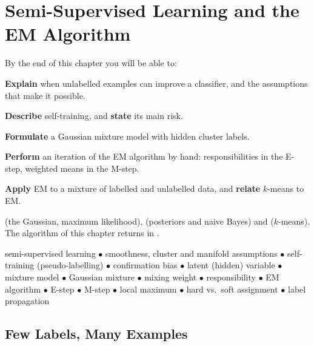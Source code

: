 \chapter{Semi-Supervised Learning and the EM Algorithm}\label{ch:semisup}

\begin{outcomes}
By the end of this chapter you will be able to:
\begin{tight}
  \item \textbf{Explain} when unlabelled examples can improve a classifier, and the
        assumptions that make it possible.
  \item \textbf{Describe} self-training, and \textbf{state} its main risk.
  \item \textbf{Formulate} a Gaussian mixture model with hidden cluster labels.
  \item \textbf{Perform} an iteration of the EM algorithm by hand: responsibilities
        in the E-step, weighted means in the M-step.
  \item \textbf{Apply} EM to a mixture of labelled and unlabelled data, and
        \textbf{relate} $k$-means to EM.
\end{tight}
\end{outcomes}

\begin{prereq}
 (the Gaussian, maximum likelihood),  (posteriors and
naive Bayes) and  ($k$-means). The algorithm of this chapter
returns in .
\end{prereq}

\begin{keyterms}
semi-supervised learning $\bullet$ smoothness, cluster and manifold assumptions
$\bullet$ self-training (pseudo-labelling) $\bullet$ confirmation bias $\bullet$
latent (hidden) variable $\bullet$ mixture model $\bullet$ Gaussian mixture
$\bullet$ mixing weight $\bullet$ responsibility $\bullet$ EM algorithm
$\bullet$ E-step $\bullet$ M-step $\bullet$ local maximum $\bullet$ hard vs.\ soft
assignment $\bullet$ label propagation
\end{keyterms}

\section{Few Labels, Many Examples}


